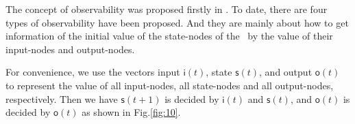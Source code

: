 
The concept of observability was proposed firstly in \cite{cheng2009controllability}. To date, there are four types of observability have been proposed. And they are mainly about how to get  information of the initial value of the state-nodes of the \BCNs\ by the value of their input-nodes and output-nodes. 

For convenience, we use the vectors input $\mathsf{i}(t)$, state $\mathsf{s}(t)$, and output $\mathsf{o}(t)$ to represent the value of all input-nodes, all state-nodes and all output-nodes, respectively. Then we have $\mathsf{s}(t+1)$ is decided by $\mathsf{i}(t)$ and $\mathsf{s}(t)$, and $\mathsf{o}(t)$ is decided by $\mathsf{o}(t)$ as shown in Fig.\ref{fig:10}.


